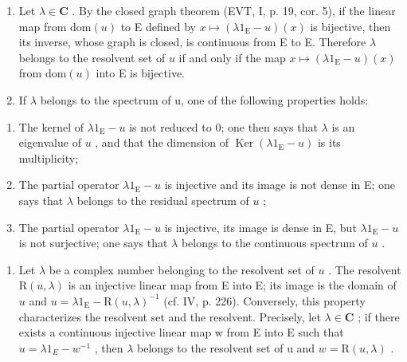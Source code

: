 \begin{enumerate}
\def\labelenumi{\arabic{enumi})}
\setcounter{enumi}{2}
\item
  Let \(\lambda \in \mathbf{C}\) . By the closed graph theorem (EVT, I, p. 19, cor. 5), if the linear map from \(\mathrm{dom}(u)\) to E defined by \(x \mapsto (\lambda 1_{\mathrm{E}} - u)(x)\) is bijective, then its inverse, whose graph is closed, is continuous from E to E. Therefore \(\lambda\) belongs to the resolvent set of \(u\) if and only if the map \(x \mapsto (\lambda 1_{\mathrm{E}} - u)(x)\) from \(\mathrm{dom}(u)\) into E is bijective.
\item
  If \(\lambda\) belongs to the spectrum of u, one of the following properties holds:
\end{enumerate}

\begin{enumerate}
\def\labelenumi{(\roman{enumi})}
\item
  The kernel of \(\lambda 1_{\mathrm{E}} - u\) is not reduced to 0; one then says that \(\lambda\) is an eigenvalue of \(u\) , and that the dimension of \(\operatorname{Ker}(\lambda 1_{\mathrm{E}} - u)\) is its multiplicity;
\item
  The partial operator \(\lambda 1_{\mathrm{E}} - u\) is injective and its image is not dense in E; one says that \(\lambda\) belongs to the residual spectrum of \(u\) ;
\item
  The partial operator \(\lambda 1_{\mathrm{E}} - u\) is injective, its image is dense in E, but \(\lambda 1_{\mathrm{E}} - u\) is not surjective; one says that \(\lambda\) belongs to the continuous spectrum of \(u\) .
\end{enumerate}

\begin{enumerate}
\def\labelenumi{\arabic{enumi})}
\setcounter{enumi}{4}
\tightlist
\item
  Let \(\lambda\) be a complex number belonging to the resolvent set of \(u\) . The resolvent \(\mathrm{R}(u,\lambda)\) is an injective linear map from E into E; its image is the domain of \(u\) and \(u = \lambda 1_{\mathrm{E}} - \mathrm{R}(u,\lambda)^{-1}\) (cf. IV, p. 226). Conversely, this property characterizes the resolvent set and the resolvent. Precisely, let \(\lambda \in \mathbf{C}\) ; if there exists a continuous injective linear map w from E into E such that \(u = \lambda 1_{E} - w^{-1}\) , then \(\lambda\) belongs to the resolvent set of u and \(w = \mathrm{R}(u, \lambda)\) .
\end{enumerate}

